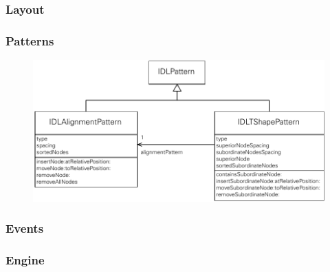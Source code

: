 
\subsubsection{Layout}

\subsubsection{Patterns}


\begin{figure}[hbt]
    \centering
    \includegraphics[width=\textwidth]{resources/layout-patterns-implementation}
    \caption{}
    \label{fig:layout-patterns-implementation}
\end{figure}

\subsubsection{Events}

\subsubsection{Engine}




